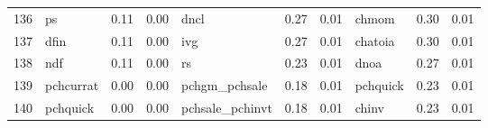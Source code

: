 \documentclass[12pt]{article}
\begin{document}
\begin{landscape}
\begin{footnotesize}
\begin{longtable}{l|lcc|lcc|lcc}
			136                   & ps                          & 0.11                                                                                 & 0.00                            & dncl                        & 0.27                                                                                 & 0.01                            & chmom                       & 0.30                                                                                 & 0.01                           \\
			137                   & dfin                        & 0.11                                                                                 & 0.00                            & ivg                         & 0.27                                                                                 & 0.01                            & chatoia                     & 0.30                                                                                 & 0.01                           \\
			138                   & ndf                         & 0.11                                                                                 & 0.00                            & rs                          & 0.23                                                                                 & 0.01                            & dnoa                        & 0.27                                                                                 & 0.01                           \\
			139                   & pchcurrat                   & 0.00                                                                                 & 0.00                            & pchgm\_pchsale              & 0.18                                                                                 & 0.01                            & pchquick                    & 0.23                                                                                 & 0.01                           \\
			140                   & pchquick                    & 0.00                                                                                 & 0.00                            & pchsale\_pchinvt            & 0.18                                                                                 & 0.01                            & chinv                       & 0.23                                                                                 & 0.01                           \\

\end{longtable}
\end{footnotesize}
\end{landscape}
\end{document}

